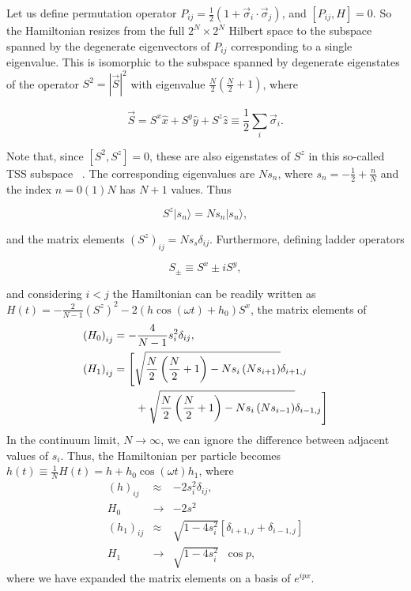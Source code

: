 \documentclass[%
 reprint,
 amsmath,amssymb,
 aps,
]{revtex4-2}
\begin{document}
Let us define permutation operator $P_{ij} = \displaystyle\frac{1}{2}\left(1+ \vec{\sigma}_i\cdot\vec{\sigma}_j\right)$,
and $[P_{ij}, H]=0$. So the Hamiltonian resizes from the full $2^N\times 2^N$ Hilbert space to the subspace spanned by the degenerate eigenvectors of $P_{ij}$ corresponding to a single eigenvalue.
This is isomorphic to the subspace spanned by degenerate eigenstates of the operator $S^2=|\vec{S}|^2$ with eigenvalue $\displaystyle\frac{N}{2}\left(\frac{N}{2}+1\right)$, where

\begin{equation}
	\vec{S}=S^x\hat{x}+S^y\hat{y}+S^z\hat{z}\equiv\frac12 \sum_i \vec{\sigma}_i.
\end{equation}

Note that, since $[S^2, S^z]=0$, these are also eigenstates of $S^z$ in this so-called TSS subspace ~\cite{mori_prethermalization_2019}. The corresponding eigenvalues are $Ns_n$, where $s_n=-\frac{1}{2}+\frac{n}{N}$ and the index
$n= 0 (1) N$ has $N+1$ values. Thus

\begin{equation}
	S^z |s_n\rangle = Ns_n|s_n\rangle,
\end{equation}

and the matrix elements $(S^z)_{ij} = Ns_s\delta_{ij}$. Furthermore, defining ladder operators

\begin{equation}
	S_\pm \equiv S^x \pm i S^y,
\end{equation}

and considering $i<j$ the Hamiltonian can be readily written as
$H(t) = -\displaystyle\frac{2}{N-1}(S^z)^2 - 2(h \cos{(\omega t )} + h_0)S^x$, the matrix elements of
\begin{align}
	\left(H_0\right)_{ij} &= -\frac{4}{N-1} s^2_i \delta_{ij},\nonumber\\
	\left(H_1\right)_{ij} &= \Bigg[\sqrt{\frac{N}{2}\left(\frac{N}{2}+1\right) - Ns_i\left(Ns_{i + 1}\right)}\delta_{i+1, j} \nonumber\\ 
	&\hskip 0.7cm +\sqrt{\frac{N}{2}\left(\frac{N}{2}+1\right) - Ns_i\left(Ns_{i- 1}\right)}\delta_{i-1,j}\Bigg]
\end{align}
In the continuum limit, $N\rightarrow\infty$, we can ignore the difference between adjacent values
of $s_i$. Thus, the Hamiltonian per particle becomes $h(t)\equiv \displaystyle\frac{1}{N}H(t) = h + h_0\cos{(\omega t)}h_1$, where
\begin{eqnarray}
	\left(h\right)_{ij} &\approx& - 2s^2_i \delta_{ij},\nonumber\\
	H_0 &\rightarrow& -2s^2\\
	\left(h_1\right)_{ij} &\approx& \sqrt{1 - 4s^2_i}\left[\delta_{i+1, j}  + \delta_{i-1,j}\right]\nonumber\\
	H_1 &\rightarrow& \sqrt{1 - 4s^2_i}\;\;\cos{p},
\end{eqnarray}
where we have expanded the matrix elements on a basis of $e^{ipx}$.
\end{document}
